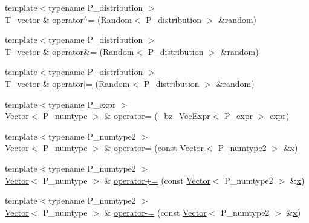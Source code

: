 \begin{DoxyCompactItemize}
\item 
{\footnotesize template$<$typename P\+\_\+distribution $>$ }\\\hyperlink{classVector_a29e279edfeac4d65aad0d814c05cfaf0}{T\+\_\+vector} \& \hyperlink{classVector_a9a5d17834a34214af23eca715026f385}{operator$^\wedge$=} (\hyperlink{classRandom}{Random}$<$ P\+\_\+distribution $>$ \&random)
\item 
{\footnotesize template$<$typename P\+\_\+distribution $>$ }\\\hyperlink{classVector_a29e279edfeac4d65aad0d814c05cfaf0}{T\+\_\+vector} \& \hyperlink{classVector_a56979f15c7f679323b3d204edf6bf51e}{operator\&=} (\hyperlink{classRandom}{Random}$<$ P\+\_\+distribution $>$ \&random)
\item 
{\footnotesize template$<$typename P\+\_\+distribution $>$ }\\\hyperlink{classVector_a29e279edfeac4d65aad0d814c05cfaf0}{T\+\_\+vector} \& \hyperlink{classVector_abb931c8eaea0da7d1ee7234985a33198}{operator$\vert$=} (\hyperlink{classRandom}{Random}$<$ P\+\_\+distribution $>$ \&random)
\item 
{\footnotesize template$<$typename P\+\_\+expr $>$ }\\\hyperlink{classVector}{Vector}$<$ P\+\_\+numtype $>$ \& \hyperlink{classVector_aefbd75d2255c72c4743f86dbbe0ae95f}{operator=} (\hyperlink{class__bz__VecExpr}{\+\_\+bz\+\_\+\+Vec\+Expr}$<$ P\+\_\+expr $>$ expr)
\item 
{\footnotesize template$<$typename P\+\_\+numtype2 $>$ }\\\hyperlink{classVector}{Vector}$<$ P\+\_\+numtype $>$ \& \hyperlink{classVector_a6fbe66e214511b2b96c101a591f9e11d}{operator=} (const \hyperlink{classVector}{Vector}$<$ P\+\_\+numtype2 $>$ \&\hyperlink{vecnorm1_8cc_ac73eed9e41ec09d58f112f06c2d6cb63}{x})
\item 
{\footnotesize template$<$typename P\+\_\+numtype2 $>$ }\\\hyperlink{classVector}{Vector}$<$ P\+\_\+numtype $>$ \& \hyperlink{classVector_a79b0e2105e2220027ec26eb584f7c832}{operator+=} (const \hyperlink{classVector}{Vector}$<$ P\+\_\+numtype2 $>$ \&\hyperlink{vecnorm1_8cc_ac73eed9e41ec09d58f112f06c2d6cb63}{x})
\item 
{\footnotesize template$<$typename P\+\_\+numtype2 $>$ }\\\hyperlink{classVector}{Vector}$<$ P\+\_\+numtype $>$ \& \hyperlink{classVector_a1b4824a4992f0a77bea4bc26d450aab1}{operator-\/=} (const \hyperlink{classVector}{Vector}$<$ P\+\_\+numtype2 $>$ \&\hyperlink{vecnorm1_8cc_ac73eed9e41ec09d58f112f06c2d6cb63}{x})

\end{DoxyCompactItemize}
